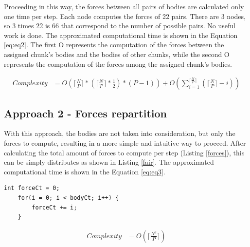 \documentclass[a4paper]{article}
\begin{document}
Proceeding in this way, the forces between all pairs of bodies are calculated only one time per step. Each node computes the forces of 22 pairs. There are 3 nodes, so 3 times 22 is 66 that correspond to the number of possible pairs. No useful work is done. The approximated computational time is shown in the Equation \ref{eq:eq2}. The first O represents the computation of the forces between the assigned chunk's bodies and the bodies of other chunks, while the second O represents the computation of the forces among the assigned chunk's bodies.

\begin{equation} \label{eq:eq2}
\begin{split}
Complexity & = O(\lceil\frac{N}{P}\rceil * (\lceil\frac{N}{P}\rceil * \frac{1}{2}) * (P-1)) +  O(\sum_{i=1}^{\lceil\frac{N}{P}\rceil} {(\lceil\frac{N}{P}\rceil-i)})
\end{split}
\end{equation}

\subsection{Approach 2 - Forces repartition}
\label{sec:a2}
With this approach, the bodies are not taken into consideration, but only the forces to compute, resulting in a more simple and intuitive way to proceed. After calculating the total amount of forces to compute per step (Listing \ref{forces}), this can be simply distributes as shown in Listing \ref{fair}. The approximated computational time is shown in the Equation \ref{eq:eq3}.

\begin{lstlisting}[label=forces, caption=total amount of forces]
int forceCt = 0;
    for(i = 0; i < bodyCt; i++) {
        forceCt += i;
    }
\end{lstlisting}

\begin{equation} \label{eq:eq3}
\begin{split}
Complexity & = O(\lceil\frac{N^2}{P}\rceil)
\end{split}
\end{equation}
\end{document}
